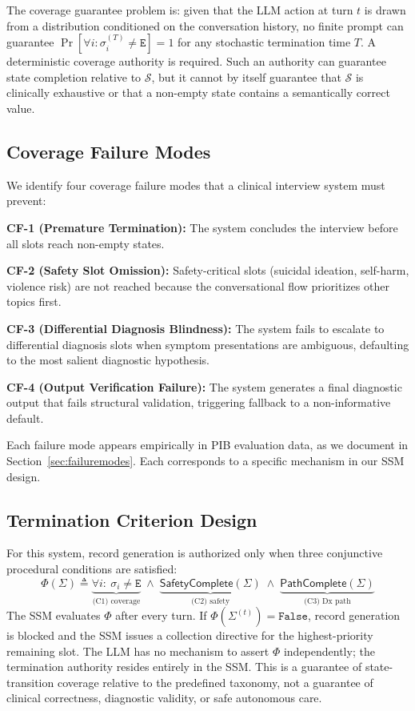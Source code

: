 \documentclass[conference]{IEEEtran}
\begin{document}
The coverage guarantee problem is: given that the LLM action at turn $t$ is drawn from a distribution conditioned on the conversation history, no finite prompt can guarantee $\Pr[\forall i: \sigma_i^{(T)} \neq \texttt{E}] = 1$ for any stochastic termination time $T$. A deterministic coverage authority is required. Such an authority can guarantee state completion relative to $\mathcal{S}$, but it cannot by itself guarantee that $\mathcal{S}$ is clinically exhaustive or that a non-empty state contains a semantically correct value.

\subsection{Coverage Failure Modes}

We identify four coverage failure modes that a clinical interview system must prevent:

\textbf{CF-1 (Premature Termination):} The system concludes the interview before all slots reach non-empty states.

\textbf{CF-2 (Safety Slot Omission):} Safety-critical slots (suicidal ideation, self-harm, violence risk) are not reached because the conversational flow prioritizes other topics first.

\textbf{CF-3 (Differential Diagnosis Blindness):} The system fails to escalate to differential diagnosis slots when symptom presentations are ambiguous, defaulting to the most salient diagnostic hypothesis.

\textbf{CF-4 (Output Verification Failure):} The system generates a final diagnostic output that fails structural validation, triggering fallback to a non-informative default.

Each failure mode appears empirically in PIB evaluation data, as we document in Section~\ref{sec:failuremodes}. Each corresponds to a specific mechanism in our SSM design.

\subsection{Termination Criterion Design}

For this system, record generation is authorized only when three conjunctive procedural conditions are satisfied:
{\small\[
\Phi(\Sigma) \triangleq \underbrace{\forall i:\ \sigma_i \neq \texttt{E}}_{\text{(C1) coverage}} \;\wedge\; \underbrace{\mathsf{SafetyComplete}(\Sigma)}_{\text{(C2) safety}} \;\wedge\; \underbrace{\mathsf{PathComplete}(\Sigma)}_{\text{(C3) Dx path}}
\]}
The SSM evaluates $\Phi$ after every turn. If $\Phi(\Sigma^{(t)}) = \texttt{False}$, record generation is blocked and the SSM issues a collection directive for the highest-priority remaining slot. The LLM has no mechanism to assert $\Phi$ independently; the termination authority resides entirely in the SSM. This is a guarantee of state-transition coverage relative to the predefined taxonomy, not a guarantee of clinical correctness, diagnostic validity, or safe autonomous care.
\end{document}
